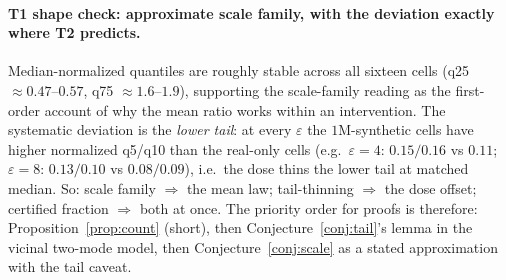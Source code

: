 \documentclass[11pt]{article}
\theoremstyle{definition}
\begin{document}
\paragraph{T1 shape check: approximate scale family, with the deviation exactly where T2 predicts.}
Median-normalized quantiles are roughly stable across all sixteen cells (q25 $\approx0.47$--$0.57$,
q75 $\approx1.6$--$1.9$), supporting the scale-family reading as the first-order account of why the
mean ratio works within an intervention. The systematic deviation is the \emph{lower tail}: at every
$\varepsilon$ the $1$M-synthetic cells have higher normalized q5/q10 than the real-only cells
(e.g.\ $\varepsilon=4$: $0.15/0.16$ vs $0.11$; $\varepsilon=8$: $0.13/0.10$ vs $0.08/0.09$), i.e.\
the dose thins the lower tail at matched median. So: scale family $\Rightarrow$ the mean law;
tail-thinning $\Rightarrow$ the dose offset; certified fraction $\Rightarrow$ both at once. The
priority order for proofs is therefore: Proposition~\ref{prop:count} (short), then
Conjecture~\ref{conj:tail}'s lemma in the vicinal two-mode model, then
Conjecture~\ref{conj:scale} as a stated approximation with the tail caveat.
\end{document}
